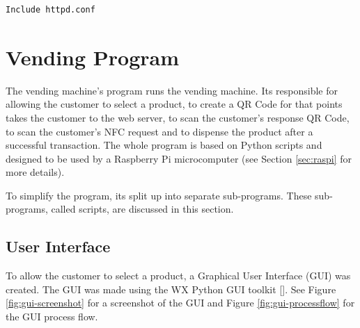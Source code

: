 \begin{verbatim}
Include httpd.conf
\end{verbatim}

\section{Vending Program}

The vending machine's program runs the vending machine. Its responsible for
allowing the customer to select a product, to create a QR Code for that points
takes the customer to the web server, to scan the customer's response QR Code,
to scan the customer's NFC request and to dispense the product after a
successful transaction. The whole program is based on Python scripts and
designed to be used by a Raspberry Pi microcomputer (see Section
\ref{sec:raspi} for more details).

To simplify the program, its split up into separate sub-programs. These
sub-programs, called scripts, are discussed in this section.

\subsection{User Interface}

To allow the customer to select a product, a Graphical User Interface (GUI) was
created. The GUI was made using the WX Python GUI toolkit
[\cite{website:wx-python}].
See Figure \ref{fig:gui-screenshot} for a screenshot of the GUI and Figure
\ref{fig:gui-processflow} for the GUI process flow.

